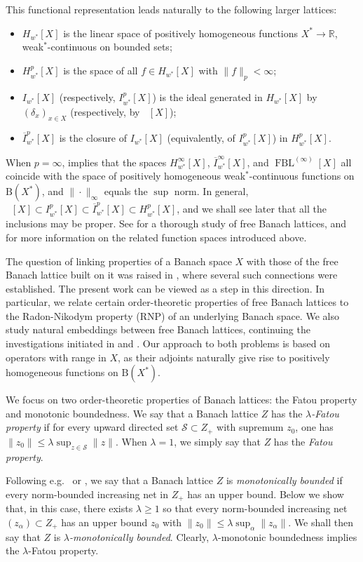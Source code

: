 \documentclass{amsart}
\theoremstyle{plain}
\theoremstyle{definition}
\numberwithin{equation}{section}
\newcommand{\R}{\mathbb{R}}
\newcommand{\ball}{\mathrm{B}}
\DeclareMathOperator{\FBL}{FBL}
\DeclareMathOperator{\FBLp}{FBL^{\mathit{(p)}}}
\newcommand{\Hp}{H_{w^*}^{p}}
\newcommand{\nip}{I_{w^*}^{p}}
\newcommand{\Ip}{\overline{I}_{w^*}^{p}}
\begin{document}
This functional representation leads naturally to the following larger lattices: 
\begin{itemize}
 \item $H_{w^*}[X]$ is the linear space of positively homogeneous functions $X^* \to \R$, weak$^*$-continuous on bounded sets;
 \item $\Hp[X]$ is the space of all $f \in H_{w^*}[X]$ with $\|f\|_p < \infty$;
 \item $I_{w^*}[X]$ (respectively, $\nip[X]$) is the ideal generated in $H_{w^*}[X]$ by $(\delta_x)_{x \in X}$ (respectively, by $\FBLp[X]$);
 \item $\Ip[X]$ is the closure of $I_{w^*}[X]$ (equivalently, of $\nip[X]$) in $\Hp[X]$.
\end{itemize}
When $p = \infty$, \cite[Proposition 2.2]{OiTTT} implies that the spaces $H_{w^*}^\infty[X]$, $\overline{I}_{w^*}^\infty[X]$, and $\FBL^{(\infty)}[X]$ all coincide with the space of positively homogeneous weak$^*$-continuous functions on $\ball(X^*)$, and $\| \cdot \|_\infty$ equals the $\sup$ norm. In general, $\FBLp[X] \subset \nip[X] \subset \Ip[X] \subset \Hp[X]$, and we shall see later that all the inclusions may be proper. See \cite{OiTTT} for a thorough study of free Banach lattices, and \cite{LaTr} for more information on the related function spaces introduced above.


The question of linking properties of a Banach space $X$ with those of the free Banach lattice built on it was raised in \cite{OiTTT}, where several such connections were established. The present work can be viewed as a step in this direction. In particular, we relate certain order-theoretic properties of free Banach lattices to the Radon-Nikodym property (RNP) of an underlying Banach space. We also study natural embeddings between free Banach lattices, continuing the investigations initiated in \cite{OiTTT} and \cite{AD}. Our approach to both problems is based on operators with range in $X$, as their adjoints naturally give rise to positively homogeneous functions on $\ball(X^*)$.

We focus on two order-theoretic properties of Banach lattices: the Fatou property and monotonic boundedness.
We say that a Banach lattice $Z$ has the \emph{$\lambda$-Fatou property} if for every upward directed set ${\mathcal{S}} \subset Z_+$ with supremum $z_0$, one has $\|z_0\| \leq \lambda \sup_{z \in {\mathcal{S}}} \|z\|$. When $\lambda = 1$, we simply say that $Z$ has the \emph{Fatou property}.

Following e.g.~\cite[Definition 4.2]{DLOT} or \cite[Section 10]{Taylor}, we say that a Banach lattice $Z$ is \emph{monotonically bounded} if every norm-bounded increasing net in $Z_+$ has an upper bound. Below we show that, in this case, there exists $\lambda \geq 1$ so that every norm-bounded increasing net $(z_\alpha) \subset Z_+$ has an upper bound $z_0$ with $\|z_0\| \leq \lambda \sup_\alpha \|z_\alpha\|$.
We shall then say that $Z$ is \emph{$\lambda$-monotonically bounded}. Clearly, $\lambda$-monotonic boundedness implies the $\lambda$-Fatou property.
\end{document}
